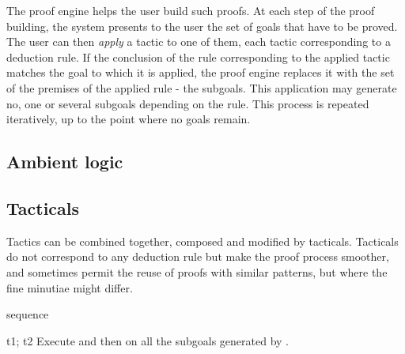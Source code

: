 The \EasyCrypt proof engine helps the user build such proofs. At each step
of the proof building, the system presents to the user the set of goals
that have to be proved. The user can then \emph{apply} a tactic to one of
them, each tactic corresponding to a deduction rule. If the conclusion
of the rule corresponding to the applied tactic matches the goal to which
it is applied, the proof engine replaces it with the set of the
premises of the applied rule - the subgoals. This application may generate
no, one or several subgoals depending on the rule. This process is repeated
iteratively, up to the point where no goals remain.

\subsection{Ambient logic}


































\subsection{Tacticals}

Tactics can be combined together, composed and modified by tacticals. Tacticals do not
correspond to any deduction rule but make the proof process smoother, and sometimes permit
the reuse of proofs with similar patterns, but where the fine minutiae might differ.

\begin{tactic}[t1; t2]{sequence}
  \begin{tsyntax}[empty]{t1; t2}
  Execute  and then  on all the subgoals generated by .
  \end{tsyntax}
\end{tactic}

